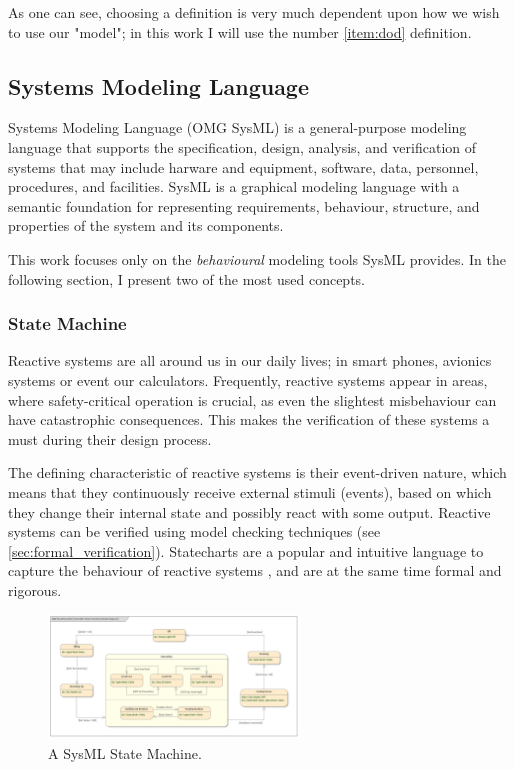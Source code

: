 As one can see, choosing a definition is very much dependent upon how we wish to use our "model"; in this work I will use the number \ref{item:dod} definition.

\subsection{Systems Modeling Language}\label{ssec:sysml}

Systems Modeling Language (OMG SysML)\cite{omg_sysml} is a general-purpose modeling language that supports the specification, design, analysis, and verification of systems that may include harware and equipment, software, data, personnel, procedures, and facilities. SysML is a graphical modeling language with a semantic foundation for representing requirements, behaviour, structure, and properties of the system and its components.\cite{sysml_practical_guide}

This work focuses only on the \emph{behavioural} modeling tools SysML provides. In the following section, I present two of the most used concepts.

\subsubsection{State Machine}

Reactive systems are all around us in our daily lives; in smart phones, avionics systems or event our calculators. Frequently, reactive systems appear in areas, where safety-critical operation is crucial, as even the slightest
misbehaviour can have catastrophic consequences. This makes the verification of these systems a must during their design process.

The defining characteristic of reactive systems is their event-driven nature, which means that they continuously receive external stimuli (events), based on which they change their internal state and possibly react with some output\cite{10.1007/978-3-642-82453-1_17}. Reactive systems can be verified using model checking techniques (see \autoref{sec:formal_verification}). Statecharts\cite{HAREL1987231} are a popular and intuitive language to capture the behaviour of reactive systems \cite{10.1145/3417990.3421407, 10.1007/978-3-319-11653-2_10}, and are at the same time formal and rigorous. 

\begin{figure}[!ht]
	\centering
	\includegraphics[width=67mm, keepaspectratio]{figures/sysml_state_machine.png}\hspace{1cm}
	\caption{A SysML State Machine.}
	\label{fig:sysml_state_machine}
\end{figure}

